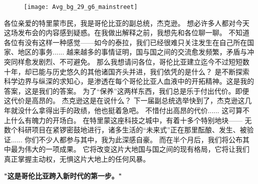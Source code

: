 \documentclass[openany]{book}
\begin{document}
\begin{figure}[h]
    \centering
    \texttt{[image: Avg\_bg\_29\_g6\_mainstreet]}
\end{figure}
\begin{dialogue}
     各位亲爱的特里蒙市民，我是哥伦比亚的副总统，杰克逊。
     想必许多人都对今天这场发布会的内容感到疑惑。在我做出解释之前，我想先和各位聊一聊。
     不知道各位有没有这样一种感觉——如今的泰拉，我们已经很难只关注发生在自己所在国家、地区的事务......
     越来越多的事情证明，国与国之间的交流愈发频繁，矛盾与冲突同样愈发剧烈、不可避免。
     那么我想请问各位，哥伦比亚建立迄今不过短短数十年，却已能与历史悠久的其他诸国齐头并进，我们依凭的是什么？
     是不断探索科学边界与纵深的求知心，是渗透在每个哥伦比亚人血液中的开拓精神。这是我的答案，这是我们的答案。
     为了“保养”这两样东西，我们总是乐于付出代价。即便这代价是高昂的。
     杰克逊这是在说什么？
     下一届副总统选举快到了，杰克逊这几年就没什么拿得出手的政绩，他也挺着急吧。
     不惜付出高昂的代价......
     这可算不上什么有魄力的开场白。
     在特里蒙这座科技之城中，有着十多个特别地块——
     无数个科研项目在紧锣密鼓地进行，诸多生活的“未来式”正在那里酝酿、发生、被验证......
     你们不少人都参与其中，我为此深感自豪。
     而在半个月后，我们将公布其中最为伟大的一项成果。
     它将改变这片大地国与国之间的现有格局，它将让我们真正掌握主动权，无惧这片大地上的任何风暴。
\end{dialogue}
\begin{center} \textbf{"这是哥伦比亚跨入新时代的第一步。"}\end{center}
\end{document}
